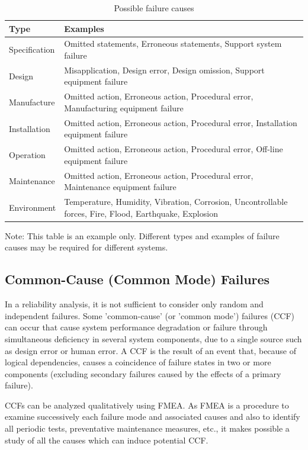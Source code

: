 \documentclass[./dissertation.tex]{subfiles}
\begin{document}
\begin{table}[H]
\centering
\caption{Possible failure causes}
\label{tab:failure-causes2}
\begin{tabular}{|l|l|}
\hline
\textbf{Type} & \textbf{Examples} \\
\hline
Specification & Omitted statements, Erroneous statements, Support system failure \\
\hline
Design & Misapplication, Design error, Design omission, Support equipment failure \\
\hline
Manufacture & Omitted action, Erroneous action, Procedural error, Manufacturing equipment failure \\
\hline
Installation & Omitted action, Erroneous action, Procedural error, Installation equipment failure \\
\hline
Operation & Omitted action, Erroneous action, Procedural error, Off-line equipment failure \\
\hline
Maintenance & Omitted action, Erroneous action, Procedural error, Maintenance equipment failure \\
\hline
Environment & Temperature, Humidity, Vibration, Corrosion, Uncontrollable forces, Fire, Flood, Earthquake, Explosion \\
\hline
\end{tabular}
\end{table}

Note: This table is an example only. Different types and examples of failure causes may be required for different systems.


\subsection{Common-Cause (Common Mode) Failures}
In a reliability analysis, it is not sufficient to consider only random and independent failures. Some 'common-cause' (or 'common mode') failures (CCF) can occur that cause system performance degradation or failure through simultaneous deficiency in several system components, due to a single source such as design error or human error. A CCF is the result of an event that, because of logical dependencies, causes a coincidence of failure states in two or more components (excluding secondary failures caused by the effects of a primary failure).

CCFs can be analyzed qualitatively using FMEA. As FMEA is a procedure to examine successively each failure mode and associated causes and also to identify all periodic tests, preventative maintenance measures, etc., it makes possible a study of all the causes which can induce potential CCF.
\end{document}

